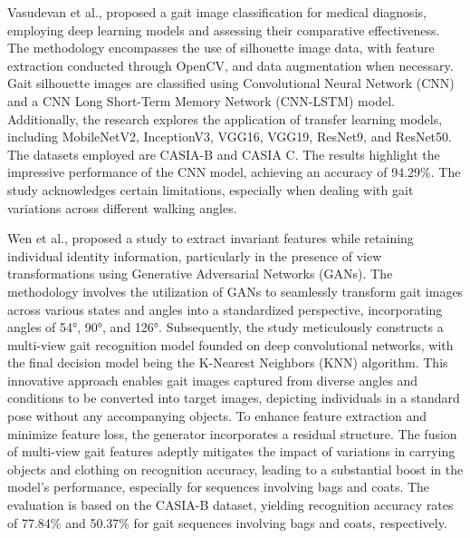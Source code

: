 \documentclass[12pt,a4paper]{article}
\begin{document}
 Vasudevan et al.\cite{vasudevan2023}, proposed a gait image classification for medical diagnosis, employing deep learning models and assessing their comparative effectiveness. The methodology encompasses the use of silhouette image data, with feature extraction conducted through OpenCV, and data augmentation when necessary. Gait silhouette images are classified using Convolutional Neural Network (CNN) and a CNN Long Short-Term Memory Network (CNN-LSTM) model. Additionally, the research explores the application of transfer learning models, including MobileNetV2, InceptionV3, VGG16, VGG19, ResNet9, and ResNet50. The datasets employed are CASIA-B and CASIA C. The results highlight the impressive performance of the CNN model, achieving an accuracy of 94.29\%. The study acknowledges certain limitations, especially when dealing with gait variations across different walking angles.

Wen et al.\cite{wen2022}, proposed a study to extract invariant features while retaining individual identity information, particularly in the presence of view transformations using Generative Adversarial Networks (GANs). The methodology involves the utilization of GANs to seamlessly transform gait images across various states and angles into a standardized perspective, incorporating angles of 54°, 90°, and 126°. Subsequently, the study meticulously constructs a multi-view gait recognition model founded on deep convolutional networks, with the final decision model being the K-Nearest Neighbors (KNN) algorithm. This innovative approach enables gait images captured from diverse angles and conditions to be converted into target images, depicting individuals in a standard pose without any accompanying objects. To enhance feature extraction and minimize feature loss, the generator incorporates a residual structure. The fusion of multi-view gait features adeptly mitigates the impact of variations in carrying objects and clothing on recognition accuracy, leading to a substantial boost in the model's performance, especially for sequences involving bags and coats. The evaluation is based on the CASIA-B dataset, yielding recognition accuracy rates of 77.84\% and 50.37\% for gait sequences involving bags and coats, respectively.
\end{document}
